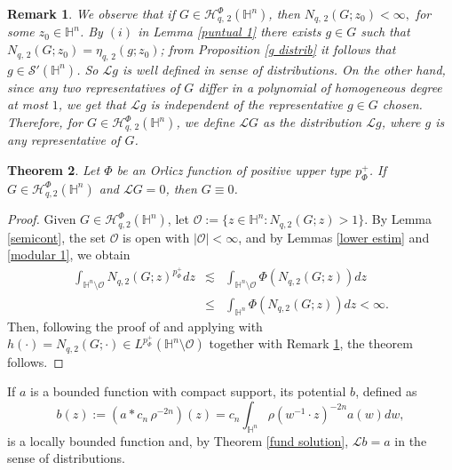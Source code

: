 \documentclass[oneside,10pt]{article}
\newtheorem{theorem}{Theorem}
\newtheorem{remark}[theorem]{Remark}
\begin{document}
\begin{remark} \label{LG definition} We observe that if $G \in \mathcal{H}^{\Phi}_{q, \, 2}(\mathbb{H}^{n})$, then 
$N_{q, \, 2}(G; z_0) < \infty,$ for some $z_0 \in \mathbb{H}^{n}$. By $(i)$ in Lemma \ref{puntual 1} there exists $g \in G$ such that 
$N_{q, \, 2}(G; z_0) = \eta_{q, \, 2}(g; z_0)$; from Proposition \ref{g distrib} it follows that $g  \in \mathcal{S}'(\mathbb{H}^{n})$. So 
$\mathcal{L} g$ is well defined in sense of distributions. On the other hand, since any two representatives of $G$ differ in a polynomial 
of homogeneous degree at most $1$, we get that $\mathcal{L} g$ is independent of the representative $g \in G$ chosen. Therefore, for 
$G \in \mathcal{H}^{\Phi}_{q, \, 2}(\mathbb{H}^{n})$, we define $\mathcal{L} G$ as the distribution $\mathcal{L} g$, where $g$ is any representative of $G$.
\end{remark}


\begin{theorem} \label{sub-lap inject}
Let $\Phi$ be an Orlicz function of positive upper type $p_{\Phi}^{+}$. If $G \in \mathcal{H}^{\Phi}_{q, 2}(\mathbb{H}^{n})$ and 
$\mathcal{L} G = 0$, then $G \equiv 0$.
\end{theorem}

\begin{proof}
Given $G \in \mathcal{H}^{\Phi}_{q, 2}(\mathbb{H}^{n})$, let $\mathcal{O} := \{ z \in \mathbb{H}^n : N_{q, 2}(G; z) > 1  \}$. By Lemma 
\ref{semicont}, the set $\mathcal{O}$ is open with $| \mathcal{O} | < \infty$, and by Lemmas \ref{lower estim} and \ref{modular 1}, we obtain
\begin{eqnarray*}
\int_{\mathbb{H}^n \setminus \mathcal{O}} N_{q, 2}(G; z)^{p_{\Phi}^{+}} dz &\lesssim& \int_{\mathbb{H}^n \setminus \mathcal{O}} 
\Phi \left( N_{q, 2}(G; z) \right) dz \\ &\leq& \int_{\mathbb{H}^n} \Phi \left( N_{q, 2}(G; z) \right) dz < \infty.
\end{eqnarray*}
Then, following the proof of \cite[Theorem 4.10]{rocha3} and applying \cite[Lemma 2.5]{rocha3} with 
$h(\cdot) = N_{q, 2}(G; \cdot) \in L^{p_{\Phi}^{+}}(\mathbb{H}^n \setminus \mathcal{O})$ together with Remark \ref{LG definition}, the 
theorem follows.
\end{proof}

If $a$ is a bounded function with compact support, its potential $b$, defined as 
\begin{equation} \label{potencial b}
b(z) := \left( a \ast c_n \, \rho^{-2n} \right)(z) = c_n \int_{\mathbb{H}^{n}} \rho(w^{-1} \cdot z)^{-2n} a(w) dw,
\end{equation}
is a locally bounded function and, by Theorem \ref{fund solution}, $\mathcal{L} b = a$ in the sense of distributions.
\end{document}
